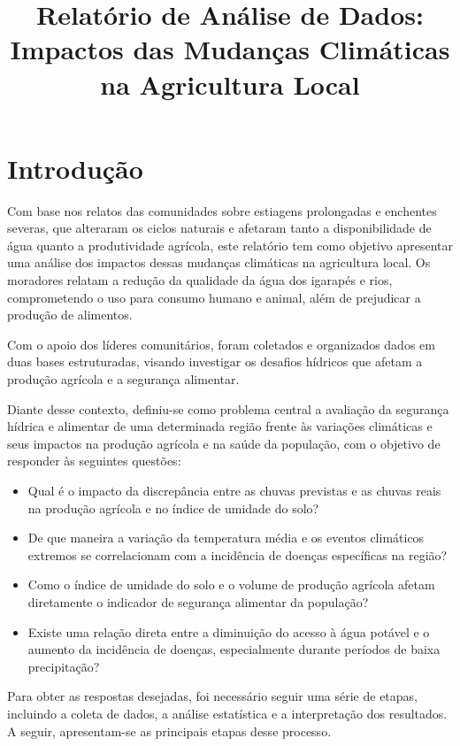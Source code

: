 \documentclass[12pt, a4paper, onecolumn]{article}
\title{Relatório de Análise de Dados: Impactos das Mudanças Climáticas na Agricultura Local}
\date{}
\begin{document}
\maketitle
\section{Introdução}
Com base nos relatos das comunidades sobre estiagens prolongadas e enchentes severas, que alteraram os ciclos naturais e afetaram tanto a disponibilidade de água quanto a produtividade agrícola, este relatório tem como objetivo apresentar uma análise dos impactos dessas mudanças climáticas na agricultura local. Os moradores relatam a redução da qualidade da água dos igarapés e rios, comprometendo o uso para consumo humano e animal, além de prejudicar a produção de alimentos.

Com o apoio dos líderes comunitários, foram coletados e organizados dados em duas bases estruturadas, visando investigar os desafios hídricos que afetam a produção agrícola e a segurança alimentar.

Diante desse contexto, definiu-se como problema central a avaliação da segurança hídrica e alimentar de uma determinada região frente às variações climáticas e seus impactos na produção agrícola e na saúde da população, com o objetivo de responder às seguintes questões:

    \begin{itemize}
        \item Qual é o impacto da discrepância entre as chuvas previstas e as chuvas reais na produção agrícola e no índice de umidade do solo?
        \item De que maneira a variação da temperatura média e os eventos climáticos extremos se correlacionam com a incidência de doenças específicas na região?
        \item Como o índice de umidade do solo e o volume de produção agrícola afetam diretamente o indicador de segurança alimentar da população?
        \item Existe uma relação direta entre a diminuição do acesso à água potável e o aumento da incidência de doenças, especialmente durante períodos de baixa precipitação?
    \end{itemize}
    
    Para obter as respostas desejadas, foi necessário seguir uma série de etapas, incluindo a coleta de dados, a análise estatística e a interpretação dos resultados. A seguir, apresentam-se as principais etapas desse processo.
\end{document}
